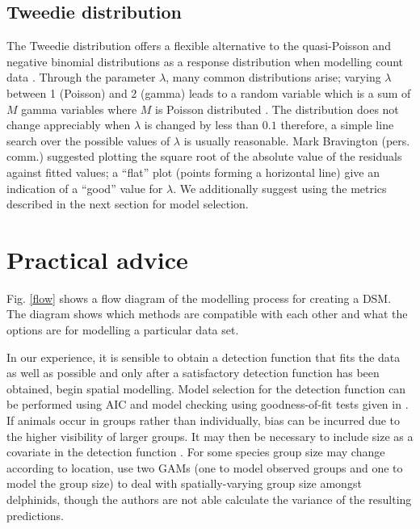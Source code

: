 \documentclass[a4paper,12pt]{article}
\begin{document}
\subsection*{Tweedie distribution}
\label{s:Tweedie}

The Tweedie distribution offers a flexible alternative to the quasi-Poisson and negative binomial distributions as a response distribution when modelling count data \citep{Candy:2004tb}. Through the parameter $\lambda$, many common distributions arise; varying $\lambda$ between 1 (Poisson) and 2 (gamma) leads to a random variable which is a sum of $M$ gamma variables where $M$ is Poisson distributed \citep{Jorgensen:1987vg}. The distribution does not change appreciably when $\lambda$ is changed by less than $0.1$ therefore, a simple line search over the possible values of $\lambda$ is usually reasonable. Mark Bravington (pers. comm.) suggested plotting the square root of the absolute value of the residuals against fitted values; a ``flat'' plot (points forming a horizontal line) give an indication of a ``good'' value for $\lambda$. We additionally suggest using the metrics described in the next section for model selection.


\section*{Practical advice}
\label{s:practical}

Fig. \ref{flow} shows a flow diagram of the modelling process for creating a DSM. The diagram shows which methods are compatible with each other and what the options are for modelling a particular data set.

In our experience, it is sensible to obtain a detection function that fits the data as well as possible and only after a satisfactory detection function has been obtained, begin spatial modelling. Model selection for the detection function can be performed using AIC and model checking using goodness-of-fit tests given in \cite[Section 11.11]{burnham:2004vd}.  If animals occur in groups rather than individually, bias can be incurred due to the higher visibility of larger groups. It may then be necessary to include size as a covariate in the detection function \citep[see][Section 4.8.2.4]{Buckland:2001vm}. For some species group size may change according to location, \cite{Ferguson:2006ex} use two GAMs (one to model observed groups and one to model the group size) to deal with spatially-varying group size amongst delphinids, though the authors are not able calculate the variance of the resulting predictions.
\end{document}
